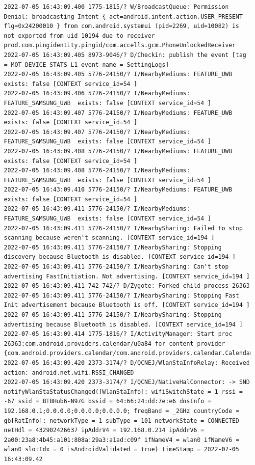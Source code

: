 \documentclass[a4paper,12pt]{book}
\begin{document}
\begin{lstlisting}
2022-07-05 16:43:09.400 1775-1815/? W/BroadcastQueue: Permission Denial: broadcasting Intent { act=android.intent.action.USER_PRESENT flg=0x24200010 } from com.android.systemui (pid=2269, uid=10082) is not exported from uid 10194 due to receiver prod.com.pingidentity.pingid/com.accells.gcm.PhoneUnlockedReceiver
2022-07-05 16:43:09.405 8973-9046/? D/Checkin: publish the event [tag = MOT_DEVICE_STATS_L1 event name = SettingLogs]
2022-07-05 16:43:09.405 5776-24150/? I/NearbyMediums: FEATURE_UWB exists: false [CONTEXT service_id=54 ]
2022-07-05 16:43:09.406 5776-24150/? I/NearbyMediums: FEATURE_SAMSUNG_UWB  exists: false [CONTEXT service_id=54 ]
2022-07-05 16:43:09.407 5776-24150/? I/NearbyMediums: FEATURE_UWB exists: false [CONTEXT service_id=54 ]
2022-07-05 16:43:09.407 5776-24150/? I/NearbyMediums: FEATURE_SAMSUNG_UWB  exists: false [CONTEXT service_id=54 ]
2022-07-05 16:43:09.408 5776-24150/? I/NearbyMediums: FEATURE_UWB exists: false [CONTEXT service_id=54 ]
2022-07-05 16:43:09.408 5776-24150/? I/NearbyMediums: FEATURE_SAMSUNG_UWB  exists: false [CONTEXT service_id=54 ]
2022-07-05 16:43:09.410 5776-24150/? I/NearbyMediums: FEATURE_UWB exists: false [CONTEXT service_id=54 ]
2022-07-05 16:43:09.411 5776-24150/? I/NearbyMediums: FEATURE_SAMSUNG_UWB  exists: false [CONTEXT service_id=54 ]
2022-07-05 16:43:09.411 5776-24150/? I/NearbySharing: Failed to stop scanning because weren't scanning. [CONTEXT service_id=194 ]
2022-07-05 16:43:09.411 5776-24150/? I/NearbySharing: Stopping discovery because Bluetooth is disabled. [CONTEXT service_id=194 ]
2022-07-05 16:43:09.411 5776-24150/? I/NearbySharing: Can't stop advertising FastInitiation. Not advertising. [CONTEXT service_id=194 ]
2022-07-05 16:43:09.411 742-742/? D/Zygote: Forked child process 26363
2022-07-05 16:43:09.411 5776-24150/? I/NearbySharing: Stopping Fast Init advertisement because Bluetooth is off. [CONTEXT service_id=194 ]
2022-07-05 16:43:09.411 5776-24150/? I/NearbySharing: Stopping advertising because Bluetooth is disabled. [CONTEXT service_id=194 ]
2022-07-05 16:43:09.414 1775-1816/? I/ActivityManager: Start proc 26363:com.android.providers.calendar/u0a84 for content provider {com.android.providers.calendar/com.android.providers.calendar.CalendarProvider2}
2022-07-05 16:43:09.420 2373-3174/? D/QCNEJ/WlanStaInfoRelay: Received action: android.net.wifi.RSSI_CHANGED
2022-07-05 16:43:09.420 2373-3174/? I/QCNEJ/NativeHalConnector: -> SND notifyWlanStaStatusChanged([WlanStaInfo]: wifiSwitchState = 1 rssi = -67 ssid = BTBHub6-N97G bssid = 64:66:24:dd:7e:e6 dnsInfo = 192.168.0.1;0.0.0.0;0.0.0.0;0.0.0.0; freqBand = _2GHz countryCode = gb[RatInfo]: networkType = 1 subType = 101 networkState = CONNECTED netHdl = 432902426637 ipAddrV4 = 192.168.0.214 ipAddrV6 = 2a00:23a8:4b45:a101:808a:29a3:a1ad:c09f ifNameV4 = wlan0 ifNameV6 = wlan0 slotIdx = 0 isAndroidValidated = true) timeStamp = 2022-07-05 16:43:09.42

\end{lstlisting}
\end{document}
